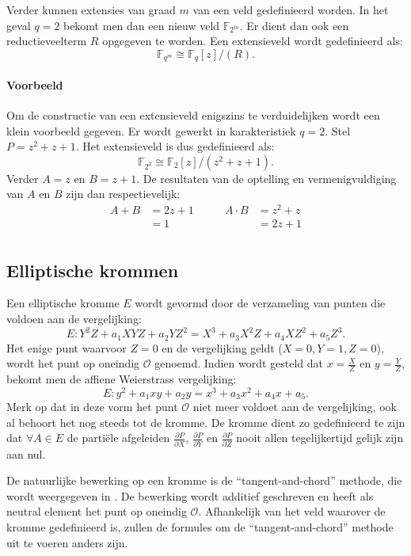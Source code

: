 Verder kunnen extensies van graad $m$ van een veld gedefinieerd worden. In het geval $q = 2$ bekomt men dan een nieuw veld $\mathbb{F}_{2^m}$. Er dient dan ook een reductieveelterm $R$ opgegeven te worden. Een extensieveld wordt gedefinieerd als:
\[\mathbb{F}_{q^m} \cong \mathbb{F}_q [z] / (R). \]

\paragraph{Voorbeeld} Om de constructie van een extensieveld enigszins te verduidelijken wordt een klein voorbeeld gegeven. Er wordt gewerkt in karakteristiek $q = 2$. Stel $P = z^2 + z + 1$. Het extensieveld is dus gedefinieerd als:
\[\mathbb{F}_{2^2} \cong \mathbb{F}_2 [z] / (z^2 + z + 1). \]
Verder $A = z$ en $B = z + 1$. De resultaten van de optelling en vermenigvuldiging van $A$ en $B$ zijn dan respectievelijk:
\[\begin{aligned}
A + B &= 2z + 1 \qquad & A \cdot B &= z^2 + z\\
&= 1	& &= 2z + 1\\
\end{aligned}\]

\subsection{Elliptische krommen}

Een elliptische kromme $E$ wordt gevormd door de verzameling van punten die voldoen aan de vergelijking:
\[E: Y^2 Z + a_1 XYZ + a_2 Y Z^2 = X^3 + a_3 X^2 Z + a_4 X Z^2 + a_5 Z^3.\]
Het enige punt waarvoor $Z = 0$ en de vergelijking geldt ($X = 0,  Y = 1, Z = 0$), wordt het punt op oneindig $\mathcal{O}$ genoemd. Indien wordt gesteld dat $x = \frac{X}{Z}$ en $y = \frac{Y}{Z}$, bekomt men de affiene Weierstrass vergelijking:
\[E: y^2 + a_1 xy + a_2 y = x^3 + a_3 x^2 + a_4 x + a_5.\]
Merk op dat in deze vorm het punt $\mathcal{O}$ niet meer voldoet aan de vergelijking, ook al behoort het nog steeds tot de kromme. De kromme dient zo gedefinieerd te zijn dat $\forall A \in E$ de parti\"ele afgeleiden $\frac{\partial P}{\partial X}$, $\frac{\partial P}{\partial Y}$ en $\frac{\partial P}{\partial Z}$ nooit allen tegelijkertijd gelijk zijn aan nul.

De natuurlijke bewerking op een kromme is de ``tangent-and-chord'' methode, die wordt weergegeven in . De bewerking wordt additief geschreven en heeft als neutral element het punt op oneindig $\mathcal{O}$. Afhankelijk van het veld waarover de kromme gedefinieerd is, zullen de formules om de ``tangent-and-chord'' methode uit te voeren anders zijn. 


